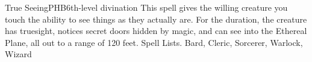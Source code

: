 \begin{spell}{True Seeing}{PHB}{6th-level divination}
{
}
This spell gives the willing creature you touch the ability to see things as they actually are. For the duration, the creature has truesight, notices secret doors hidden by magic, and can see into the Ethereal Plane, all out to a range of 120 feet.
Spell Lists. Bard, Cleric, Sorcerer, Warlock, Wizard
\end{spell}

